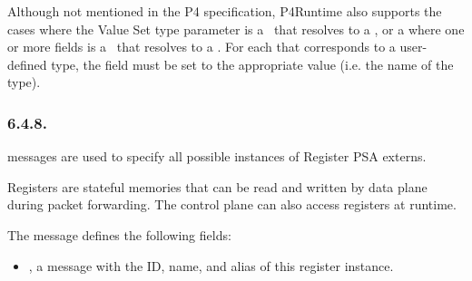 \documentclass[11pt]{article}
\begin{document}
{%
Although not mentioned in the P4 specification, P4Runtime also supports the
cases where the Value Set type parameter is a~ that resolves to a , or a  where
one or more fields is a~ that
resolves to a . For each  that corresponds to a user-defined
type, the  field must be set to the appropriate value (i.e. the name
of the type).%

\subsubsection{6.4.8.\hspace*{0.5em}}\label{sec-register}%

\noindent{} messages are used to specify all possible instances of Register PSA
externs.%

Registers are stateful memories that can be read and written by data plane
during packet forwarding. The control plane can also access registers at
runtime.%

The  message defines the following fields:%

\begin{itemize}%

\item{}
, a  message with the ID, name, and alias of this register
instance.%


\end{itemize}}
\end{document}
